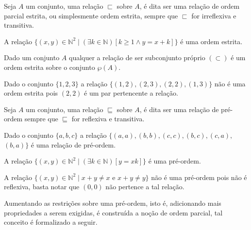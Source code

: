 \begin{definicao}\label{def:OrdemParcialEstrita}
	Seja $A$ um conjunto, uma relação $\sqsubset$ sobre $A$, é dita ser uma relação de ordem parcial estrita, ou simplesmente ordem estrita, sempre que $\sqsubset$ for irreflexiva e transitiva.
\end{definicao}

\begin{exemplo}
	A relação $\{(x, y) \in \mathbb{N}^2 \mid (\exists k \in \mathbb{N})[k \geq 1 \land y = x + k	]\}$ é uma ordem estrita.
\end{exemplo}

\begin{exemplo}
	Dado um conjunto $A$ qualquer a relação de ser subconjunto próprio $(\subset)$ é um ordem estrita sobre o conjunto $\wp(A)$.
\end{exemplo}

\begin{exemplo}
	Dado o conjunto $\{1, 2, 3\}$ a relação $\{(1, 2), (2, 3), (2, 2), (1, 3)\}$ não é uma ordem estrita pois $(2, 2)$ é um par pertencente a relação.
\end{exemplo}

\begin{definicao}\label{def:PreOrdem}
	Seja $A$ um conjunto, uma relação $\sqsubseteq$ sobre $A$, é dita ser uma relação de pré-ordem sempre que $\sqsubseteq$ for reflexiva e transitiva.
\end{definicao}

\begin{exemplo}
	Dado o conjunto $\{a, b, c\}$ a relação $\{(a, a), (b, b), (c, c), (b, c), (c, a),$ $(b, a)\}$ é uma relação de pré-ordem.
\end{exemplo}

\begin{exemplo}
	A relação $\{(x, y) \in \mathbb{N}^2 \mid (\exists k \in \mathbb{N})[y = xk]\}$ é uma pré-ordem.
\end{exemplo}

\begin{exemplo}
	A relação $\{(x, y) \in \mathbb{N}^2 \mid x + y \neq x \text{ e } x + y \neq y\}$ não é uma pré-ordem pois não é reflexiva, basta notar que $(0,0)$ não pertence a tal relação.
\end{exemplo}

Aumentando as restrições sobre uma pré-ordem, isto é, adicionando mais propriedades a serem exigidas, é construída a noção de ordem parcial, tal conceito é formalizado a seguir. 

